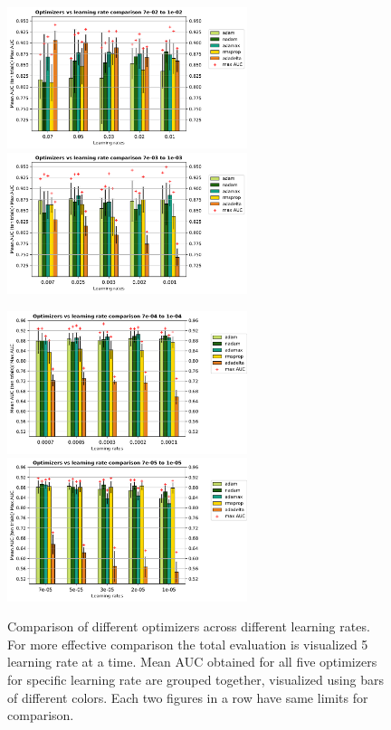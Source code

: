 \begin{figure}[ht]
\centering
\includegraphics[width=7cm]{images/densenet/siamese/densenet_siamese_lr1_bar}\quad
\includegraphics[width=7cm]{images/densenet/siamese/densenet_siamese_lr2_bar}

\medskip
\includegraphics[width=7cm]{images/densenet/siamese/densenet_siamese_lr3_bar}\quad
\includegraphics[width=7cm]{images/densenet/siamese/densenet_siamese_lr4_bar}

\caption[Comparison of different optimizers across different learning rates.]{Comparison of different optimizers across different learning rates. For more effective comparison the total evaluation is visualized 5 learning rate at a time. 
Mean AUC obtained for all five optimizers for specific learning rate are grouped together, visualized using bars of different colors. Each two figures in a row have same limits for comparison.}
\label{fig:lr_optimizers_compare}
\end{figure}


